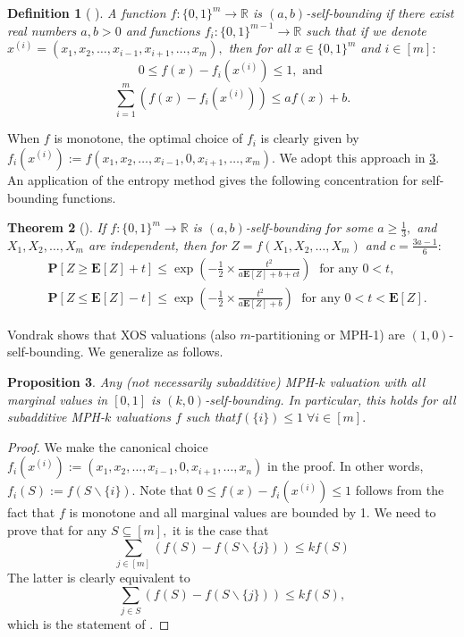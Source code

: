 \documentclass[11pt]{article}%
\newtheorem{theorem}{Theorem}
\newtheorem{definition}[theorem]{Definition}
\newtheorem{proposition}[theorem]{Proposition}
\numberwithin{theorem}{subsection}
\newcommand{\prob}{\mathbf{P}}
\newcommand{\expect}{\mathbf{E}}
\begin{document}
\begin{definition}[{
\cite[Definition 2.3]{Vondrak10}}]
\label{def:selfboundingfunctions}
A function $f:\{0,1\}^m \longrightarrow \mathbb{R}$ is $(a,b)$-self-bounding if there exist real numbers $a,b>0$ and functions $f_i:\{0,1\}^{m-1}\longrightarrow \mathbb{R}$ such that if we denote\linebreak $x^{(i)} = (x_1, x_2, \ldots, x_{i-1}, x_{i+1}, \ldots, x_m),$ then for all $x\in \{0,1\}^m$ and $i\in [m]:$
$$
0\le f(x)-f_i(x^{(i)})\le 1, \text{ and }$$
$$
\sum_{i=1}^m (f(x) - f_i(x^{(i)}))\le 
af(x) + b. 
$$
\end{definition}

\noindent
When $f$ is monotone, the optimal choice of $f_i$ is clearly given by\linebreak
$f_i(x^{(i)}):=f(x_1, x_2, \ldots, x_{i-1},0, x_{i+1}, \ldots, x_m).$ We adopt this approach in \cref{lem:MPHslefbounding}.
An application of the entropy method gives the following concentration for self-bounding functions.

\begin{theorem}[{\cite[Theorem 3.3]{Vondrak10}}]If $f:\{0,1\}^m\longrightarrow \mathbb{R}$ is $(a,b)$-self-bounding for some $a\ge \frac{1}{3},$ and $X_1, X_2, \ldots, X_m$ are independent, then for $Z = f(X_1, X_2, \ldots, X_m)$ and $c = \frac{3a-1}{6}:$
\begin{equation*}
\begin{split}
    & \prob[Z\ge \expect[Z] + t]\le
\exp\left(-\frac{1}{2}\times\frac{t^2}{a\expect[Z] + b + ct}\right)\; \text{ for any }0<t,\\
    &
     \prob[Z\le \expect[Z] - t]\le
     \exp\left(-\frac{1}{2}\times\frac{t^2}{a\expect[Z] + b}\right)\;\text{ for any }0<t<\expect[Z].
\end{split}
\end{equation*}
\end{theorem}

\noindent
Vondrak \cite[Lemma 2.2]{Vondrak10} shows that XOS valuations (also $m$-partitioning or MPH-1) are $(1,0)$-self-bounding.
We generalize as follows.

\begin{proposition}
\label{lem:MPHslefbounding}
Any (not necessarily subadditive) MPH-$k$ valuation with all marginal values in $[0,1]$ is $(k,0)$-self-bounding. In particular, this holds for all subadditive MPH-$k$ valuations $f$ such that\linebreak $f(\{i\})\le 1\; \forall i \in [m].$
\end{proposition}
\begin{proof}
We make the canonical choice $f_i(x^{(i)}):=(x_1, x_2, \ldots, x_{i-1},0, x_{i+1}, \ldots, x_n)$ in the proof. In other words, $f_i(S):=f(S\backslash \{i\}).$ 
Note that $0\le f(x)-f_i(x^{(i)})\le 1$ follows from the fact that $f$ is monotone and all marginal values are bounded by 1.
We need to prove that for any $S\subseteq [m],$ it is the case that 
$$
\sum_{j \in [m]}(f(S) - f(S\backslash\{j\}))\le 
kf(S)$$
The latter is clearly equivalent to 
$$
\sum_{j \in S}(f(S) - f(S\backslash\{j\}))\le 
kf(S),
$$
which is the statement of \cite[Lemma 6.2]{EzraFNTW19}.
\end{proof}
\end{document}
